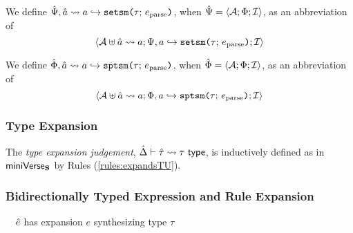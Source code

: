 We define $\uPsi, \uShyp{\tsmv}{a}{\tau}{\eparse}$, when $\uPsi=\uASI{\uA}{\Phi}{\uI}$, as an abbreviation of \[\uASI{\ctxUpdate{\uA}{\tsmv}{a}}{\Psi, \xuetsmbnd{a}{\tau}{\eparse}}{\uI}\]

We define $\uPhi, \uPhyp{\tsmv}{a}{\tau}{\eparse}$, when $\uPhi=\uASI{\uA}{\Phi}{\uI}$, as an abbreviation of \[\uASI{\ctxUpdate{\uA}{\tsmv}{a}}{\Phi, \xuptsmbnd{a}{\tau}{\eparse}}{\uI}\]

\subsubsection{Type Expansion}
The \emph{type expansion judgement}, $\expandsTU{\uDelta}{\utau}{\tau}$, is inductively defined as in $\miniVersePat$ by Rules (\ref{rules:expandsTU}).

\subsubsection{Bidirectionally Typed Expression and Rule Expansion}
\noindent{}~~$\ue$ has expansion $e$ synthesizing type $\tau$

